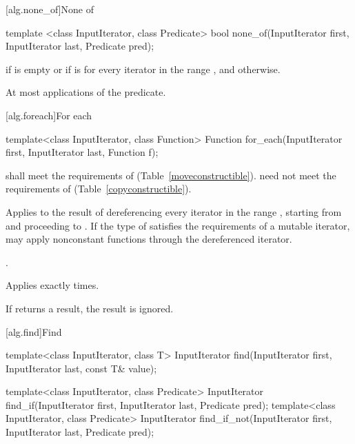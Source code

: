 [alg.none_of]{None of}

%
\begin{itemdecl}
template <class InputIterator, class Predicate>
  bool none_of(InputIterator first, InputIterator last, Predicate pred);
\end{itemdecl}

\begin{itemdescr}
\pnum
\returns {} if
 is empty or if
 is  for every iterator  in the range , and  otherwise.

\pnum
\complexity At most  applications of the predicate.
\end{itemdescr}

[alg.foreach]{For each}

%
\begin{itemdecl}
template<class InputIterator, class Function>
  Function for_each(InputIterator first, InputIterator last, Function f);
\end{itemdecl}

\begin{itemdescr}
\pnum
\requires {} shall meet the requirements of
 (Table~\ref{moveconstructible}).
\enternote {} need not meet the requirements of
 (Table~\ref{copyconstructible}). \exitnote

\pnum
\effects
Applies
 to the result of dereferencing every iterator in the range
,
starting from
and proceeding to
.
\enternote If the type of  satisfies the
requirements of a mutable iterator,  may apply nonconstant
functions through the dereferenced iterator.\exitnote

\pnum
\returns
{}.

\pnum
\complexity
Applies 
exactly
times.

\pnum
\notes
If  returns a result, the result is ignored.
\end{itemdescr}

[alg.find]{Find}

%
%
%
\begin{itemdecl}
template<class InputIterator, class T>
  InputIterator find(InputIterator first, InputIterator last,
                     const T& value);

template<class InputIterator, class Predicate>
  InputIterator find_if(InputIterator first, InputIterator last,
                        Predicate pred);
template<class InputIterator, class Predicate>
  InputIterator find_if_not(InputIterator first, InputIterator last,
                            Predicate pred);
\end{itemdecl}

